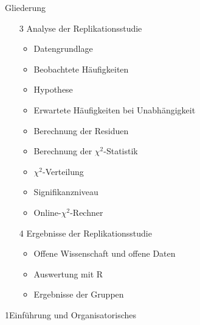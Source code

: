 \documentclass[xcolor=table,9pt,aspectratio=169]{beamer}
\begin{document}
\begin{frame}{\vspace*{10mm}Gliederung}
\begin{itemize}
   \item[3] Analyse der Replikationsstudie
   \begin{itemize}
      \item Datengrundlage
      \item Beobachtete Häufigkeiten
      \item Hypothese
      \item Erwartete Häufigkeiten bei Unabhängigkeit
      \item Berechnung der Residuen
      \item Berechnung der $\chi^{2}$-Statistik
      \item $\chi^2$-Verteilung
      \item Signifikanzniveau
      \item Online-$\chi^2$-Rechner
   \end{itemize}
   \item[4] Ergebnisse der Replikationsstudie
   \begin{itemize}
      \item Offene Wissenschaft und offene Daten
      \item Auswertung mit R
      \item Ergebnisse der Gruppen
   \end{itemize}
\end{itemize}
\end{frame}


\begin{frame}
\begin{overlayarea}{\textwidth}{0.81\paperheight}{
   \vspace*{11mm}
   \textcolor{uolblue}
   {1\hspace*{1em}Einführung und Organisatorisches}
}
\end{overlayarea}
\end{frame}
\end{document}
